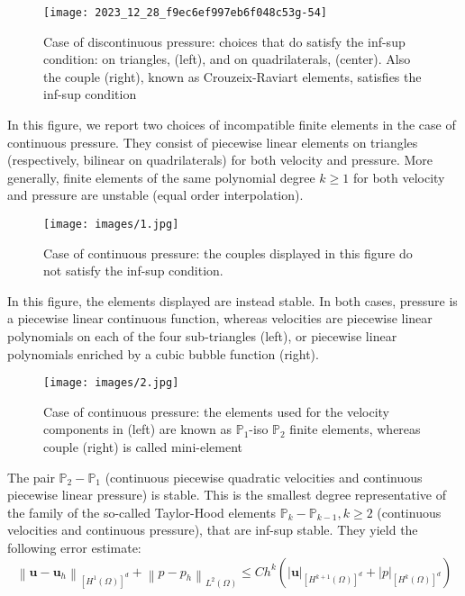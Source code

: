 \documentclass[11pt]{book}
\begin{document}
\begin{figure}[ht]
    \centering
    \texttt{[image: 2023\_12\_28\_f9ec6ef997eb6f048c53g-54]}
    \caption{Case of discontinuous pressure: choices that do satisfy the inf-sup condition: on triangles, (left), and on quadrilaterals, (center). Also the couple (right), known as Crouzeix-Raviart elements, satisfies the inf-sup condition}
    \label{fig:discontinuous-pressure-inf-sup}
\end{figure}

\noindent In this figure, we report two choices of incompatible finite elements in the case of continuous pressure. They consist of piecewise linear elements on triangles (respectively, bilinear on quadrilaterals) for both velocity and pressure. More generally, finite elements of the same polynomial degree \(k \geq 1\) for both velocity and pressure are unstable (equal order interpolation).



\FloatBarrier %
\begin{figure}[!htb] %
    \centering
    \texttt{[image: images/1.jpg]}
    \caption{Case of continuous pressure: the couples displayed in this figure do not satisfy the inf-sup condition.}
    \label{fig:continuous-pressure}
\end{figure}
\FloatBarrier %


\noindent In this figure, the elements displayed are instead stable. In both cases, pressure is a piecewise linear continuous function, whereas velocities are piecewise linear polynomials on each of the four sub-triangles (left), or piecewise linear polynomials enriched by a cubic bubble function (right).
 \FloatBarrier %
\begin{figure}[!htb] %
    \centering
    \texttt{[image: images/2.jpg]}
    \caption{Case of continuous pressure: the elements used for the velocity components in (left) are known as $\mathbb{P}_1$-iso $\mathbb{P}_2$ finite elements, whereas couple (right) is called mini-element}
    \label{fig:continuous-pressure}
\end{figure}
\FloatBarrier %
\noindent The pair $\mathbb{P}_2-\mathbb{P}_1$ (continuous piecewise quadratic velocities and continuous piecewise linear pressure) is stable. This is the smallest degree representative of the family of the so-called Taylor-Hood elements $\mathbb{P}_k-\mathbb{P}_{k-1}, k \geq 2$ (continuous velocities and continuous pressure), that are inf-sup stable.
They yield the following error estimate:
$$
\left\|\mathbf{u}-\mathbf{u}_h\right\|_{\left[H^1(\Omega)\right]^d}+\left\|p-p_h\right\|_{L^2(\Omega)} \leq C h^k\left(|\mathbf{u}|_{\left[H^{k+1}(\Omega)\right]^d}+|p|_{\left[H^k(\Omega)\right]^d}\right)
$$
\end{document}
